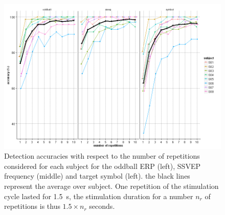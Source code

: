 %
\begin{figure}[t]
\centering
\includegraphics[width=\textwidth]{pix/exp3-acc}
\caption{
Detection accuracies with respect to the number of repetitions considered for each subject for the oddball ERP (left), SSVEP frequency (middle) and target symbol (left).
the black lines represent the average over subject.
One repetition of the stimulation cycle lasted for \SI{1.5}{\s}, the stimulation duration for a number $n_r$ of repetitions is thus $1.5 \times n_r$ seconds.
}
\label{fig:exp3-acc}
\end{figure}

